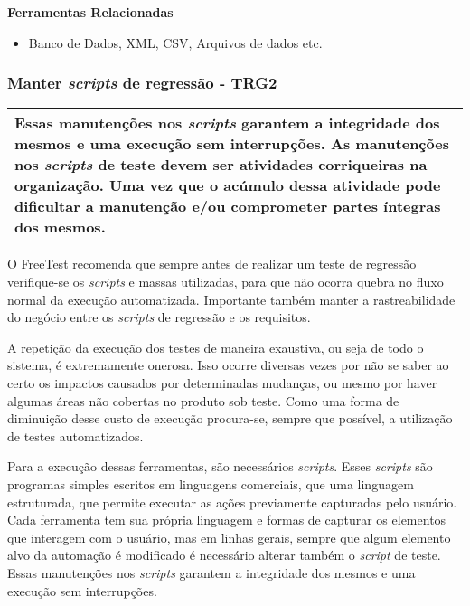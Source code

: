 \textbf{Ferramentas Relacionadas}
\begin{itemize}
    \item Banco de Dados, XML, CSV, Arquivos de dados etc.
\end{itemize}


\subsubsection{Manter \textit{scripts} de regressão - TRG2}
\label{sec:trg2}

\begin{table}[H]
\centering
\begin{tabular}{|p{130mm}|}
\hline
Essas manutenções nos \textit{scripts} garantem a integridade dos mesmos e uma execução sem interrupções.
As manutenções nos \textit{scripts} de teste devem ser atividades corriqueiras na organização. Uma vez que o acúmulo dessa atividade pode dificultar a manutenção e/ou comprometer partes íntegras dos mesmos. \\
\hline
\end{tabular}
\end{table}

O FreeTest recomenda que sempre antes de realizar um teste de regressão verifique-se os \textit{scripts} e massas utilizadas, para que não ocorra quebra no fluxo normal da execução automatizada. Importante também manter a rastreabilidade do negócio entre os \textit{scripts} de regressão e os requisitos.

A repetição da execução dos testes de maneira exaustiva, ou seja de todo o sistema, é extremamente onerosa. Isso ocorre diversas vezes por não se saber ao certo os impactos causados por determinadas mudanças, ou mesmo por haver algumas áreas não cobertas no produto sob teste. Como uma forma de diminuição desse custo de execução procura-se, sempre que possível, a utilização de testes automatizados. 

Para a execução dessas ferramentas, são necessários \textit{scripts}. Esses \textit{scripts} são programas simples escritos em linguagens comerciais, que uma linguagem estruturada, que permite executar as ações previamente capturadas pelo usuário. Cada ferramenta tem sua própria linguagem e formas de capturar os elementos que interagem com o usuário, mas em linhas gerais, sempre que algum elemento alvo da automação é modificado é necessário alterar também o \textit{script} de teste. Essas manutenções nos \textit{scripts} garantem a integridade dos mesmos e uma execução sem interrupções.

